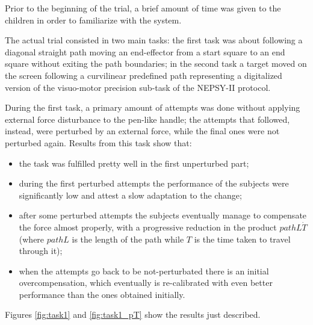 \documentclass[12pt,journal,draftclsnofoot,onecolumn]{IEEEtran}
\begin{document}
Prior to the beginning of the trial, a brief amount of time was given to the children in order to familiarize with the system.

The actual trial consisted in two main tasks: the first task was about following a diagonal straight path moving an end-effector from a start square to an end square without exiting the path boundaries; in the second task a target moved on the screen following a curvilinear predefined path representing a digitalized version of the visuo-motor precision sub-task of the NEPSY-II protocol. 

During the first task, a primary amount of attempts was done without applying external force disturbance to the pen-like handle; the attempts that followed, instead, were perturbed by an external force, while the final ones were not perturbed again. Results from this task show that:
\begin{itemize}
\item the task was fulfilled pretty well in the first unperturbed part;
\item during the first perturbed attempts the performance of the subjects were significantly low and attest a slow adaptation to the change;
\item after some perturbed attempts the subjects eventually manage to compensate the force almost properly, with a progressive reduction in the product $pathL \dot T$ (where $pathL$ is the length of the path while $T$ is the time taken to travel through it);
\item when the attempts go back to be not-perturbated there is an initial overcompensation, which eventually is re-calibrated with even better performance than the ones obtained initially.
\end{itemize}

Figures \ref{fig:task1} and \ref{fig:task1_pT} show the results just described.
\end{document}
